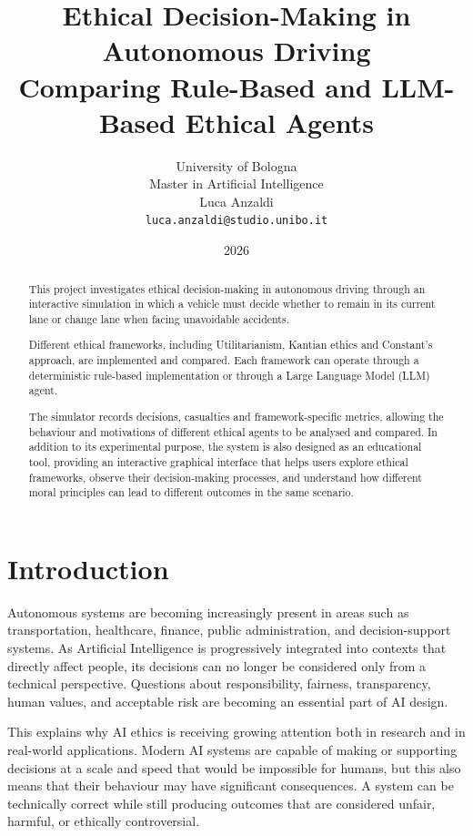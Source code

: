 \documentclass[10pt,a4paper]{article}
\title{
    \textbf{Ethical Decision-Making in Autonomous Driving}\\
    \large Comparing Rule-Based and LLM-Based Ethical Agents
}
\author{
    University of Bologna\\
    Master in Artificial Intelligence\\
    Luca Anzaldi \\
    \texttt{luca.anzaldi@studio.unibo.it}
}
\date{2026}
\begin{document}
\maketitle


\begin{abstract}
This project investigates ethical decision-making in autonomous driving
through an interactive simulation in which a vehicle must decide whether
to remain in its current lane or change lane when facing unavoidable
accidents.

Different ethical frameworks, including Utilitarianism, Kantian ethics
and Constant's approach, are implemented and compared.
Each framework can operate through a deterministic rule-based
implementation or through a Large Language Model (LLM) agent.

The simulator records decisions, casualties and framework-specific
metrics, allowing the behaviour and motivations of different ethical
agents to be analysed and compared. In addition to its experimental
purpose, the system is also designed as an educational tool, providing
an interactive graphical interface that helps users explore ethical
frameworks, observe their decision-making processes, and understand how
different moral principles can lead to different outcomes in the same
scenario.
\end{abstract}


\section{Introduction}

Autonomous systems are becoming increasingly present in areas such as transportation, healthcare, finance, public administration, and decision-support systems. As Artificial Intelligence is progressively integrated into contexts that directly affect people, its decisions can no longer be considered only from a technical perspective. Questions about responsibility, fairness, transparency, human values, and acceptable risk are becoming an essential part of AI design.

This explains why AI ethics is receiving growing attention both in research and in real-world applications. Modern AI systems are capable of making or supporting decisions at a scale and speed that would be impossible for humans, but this also means that their behaviour may have significant consequences. A system can be technically correct while still producing outcomes that are considered unfair, harmful, or ethically controversial.
\end{document}
